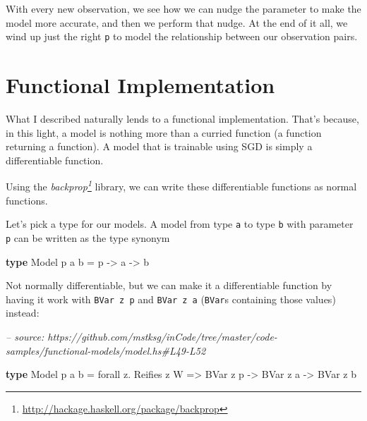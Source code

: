 \documentclass[]{article}
\newenvironment{Shaded}{}{}
\newcommand{\CommentTok}[1]{\textcolor[rgb]{0.38,0.63,0.69}{\textit{#1}}}
\newcommand{\DataTypeTok}[1]{\textcolor[rgb]{0.56,0.13,0.00}{#1}}
\newcommand{\FunctionTok}[1]{\textcolor[rgb]{0.02,0.16,0.49}{#1}}
\newcommand{\KeywordTok}[1]{\textcolor[rgb]{0.00,0.44,0.13}{\textbf{#1}}}
\newcommand{\NormalTok}[1]{#1}
\newcommand{\OtherTok}[1]{\textcolor[rgb]{0.00,0.44,0.13}{#1}}
\renewcommand{\href}[2]{#2\footnote{\url{#1}}}
\begin{document}
With every new observation, we see how we can nudge the parameter to make the
model more accurate, and then we perform that nudge. At the end of it all, we
wind up just the right \texttt{p} to model the relationship between our
observation pairs.

\hypertarget{functional-implementation}{%
\section{Functional Implementation}\label{functional-implementation}}

What I described naturally lends to a functional implementation. That's because,
in this light, a model is nothing more than a curried function (a function
returning a function). A model that is trainable using SGD is simply a
differentiable function.

Using the \emph{\href{http://hackage.haskell.org/package/backprop}{backprop}}
library, we can write these differentiable functions as normal functions.

Let's pick a type for our models. A model from type \texttt{a} to type
\texttt{b} with parameter \texttt{p} can be written as the type synonym

\begin{Shaded}
\begin{Highlighting}[]
\KeywordTok{type} \DataTypeTok{Model}\NormalTok{ p a b }\FunctionTok{=}\NormalTok{ p }\OtherTok{->}\NormalTok{ a }\OtherTok{->}\NormalTok{ b}
\end{Highlighting}
\end{Shaded}

Not normally differentiable, but we can make it a differentiable function by
having it work with \texttt{BVar\ z\ p} and \texttt{BVar\ z\ a} (\texttt{BVar}s
containing those values) instead:

\begin{Shaded}
\begin{Highlighting}[]
\CommentTok{-- source: https://github.com/mstksg/inCode/tree/master/code-samples/functional-models/model.hs#L49-L52}

\KeywordTok{type} \DataTypeTok{Model}\NormalTok{ p a b }\FunctionTok{=}\NormalTok{ forall z}\FunctionTok{.} \DataTypeTok{Reifies}\NormalTok{ z }\DataTypeTok{W}
                \OtherTok{=>} \DataTypeTok{BVar}\NormalTok{ z p}
                \OtherTok{->} \DataTypeTok{BVar}\NormalTok{ z a}
                \OtherTok{->} \DataTypeTok{BVar}\NormalTok{ z b}
\end{Highlighting}
\end{Shaded}
\end{document}
